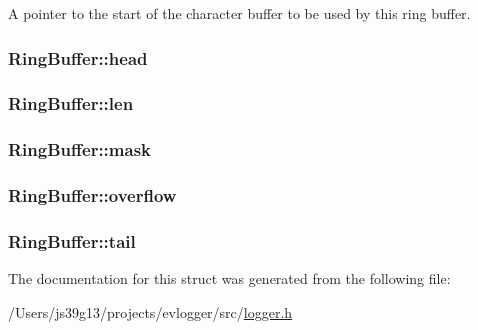 A pointer to the start of the character buffer to be used by this ring buffer. 

\hypertarget{structRingBuffer_a8c9823e492bfbf2cbeac47842a016064}{
\subsubsection[{head}]{ Ring\-Buffer\-::head}}\label{structRingBuffer_a8c9823e492bfbf2cbeac47842a016064}
\hypertarget{structRingBuffer_a923fbf140b33a972b4a9ee600d3b2c8f}{
\subsubsection[{len}]{ Ring\-Buffer\-::len}}\label{structRingBuffer_a923fbf140b33a972b4a9ee600d3b2c8f}
\hypertarget{structRingBuffer_a1a2bdd08c426bd4721d7c3d6f68c93d6}{
\subsubsection[{mask}]{ Ring\-Buffer\-::mask}}\label{structRingBuffer_a1a2bdd08c426bd4721d7c3d6f68c93d6}
\hypertarget{structRingBuffer_a2477690ded4ea57e830d91c05bf5ae70}{
\subsubsection[{overflow}]{ Ring\-Buffer\-::overflow}}\label{structRingBuffer_a2477690ded4ea57e830d91c05bf5ae70}
\hypertarget{structRingBuffer_aa2c8753c26e7a2641f6ee9f4464455e8}{
\subsubsection[{tail}]{ Ring\-Buffer\-::tail}}\label{structRingBuffer_aa2c8753c26e7a2641f6ee9f4464455e8}


The documentation for this struct was generated from the following file\-:\begin{DoxyCompactItemize}
\item 
/\-Users/js39g13/projects/evlogger/src/\hyperlink{logger_8h}{logger.\-h}\end{DoxyCompactItemize}
